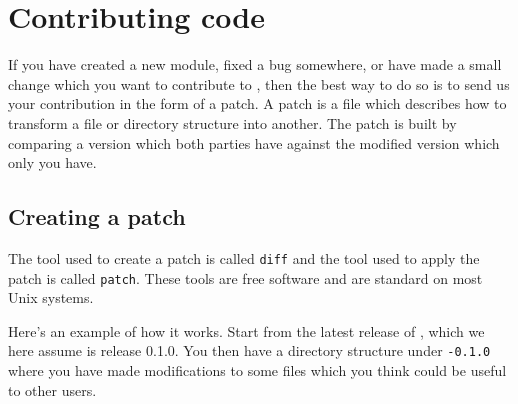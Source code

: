 
\chapter{Contributing code}

If you have created a new module, fixed a bug somewhere, or have made
a small change which you want to contribute to \package{}, then the
best way to do so is to send us your contribution in the form of a
patch. A patch is a file which describes how to transform a file or
directory structure into another. The patch is built by comparing a
version which both parties have against the modified version which
only you have.

\section{Creating a patch}

The tool used to create a patch is called \texttt{diff} and the tool
used to apply the patch is called \texttt{patch}. These tools are free
software and are standard on most Unix systems.

Here's an example of how it works. Start from the latest release of
\package{}, which we here assume is release 0.1.0. You then have a
directory structure under \texttt{\packagett{}-0.1.0} where you have made
modifications to some files which you think could be useful to
other users.


